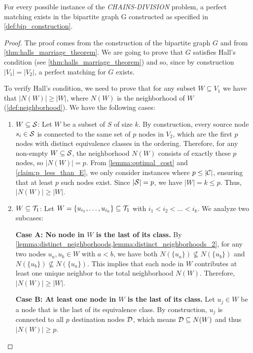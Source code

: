 \begin{lemma} \label{lemma:matching_existence}
    For every possible instance of the \textit{CHAINS-DIVISION} problem, a perfect matching exists in the bipartite graph G constructed as specified in \cref{def:bip_construction}.
\end{lemma}
\begin{proof}
    The proof comes from the construction of the bipartite graph $G$ and from \cref{thm:halls_marriage_theorem}. We are going to prove that $G$ satisfies Hall's condition (see \cref{thm:halls_marriage_theorem}) and so, since by construction $|V_1| = |V_2|$, a perfect matching for $G$ exists.

    To verify Hall's condition, we need to prove that for any subset $W \subseteq V_1$ we have that $|N(W)| \geq |W|$, where $N(W)$ is the neighborhood of $W$ (\cref{def:neighborhood}). We have the following cases:
    \begin{enumerate}[leftmargin=25pt]
        \item $W \subseteq \mathcal{S}$: Let $W$ be a subset of $S$ of size $k$. By construction, every source node $s_i \in \mathcal{S}$ is connected to the same set of $p$ nodes in $V_2$, which are the first $p$ nodes with distinct equivalence classes in the ordering. Therefore, for any non-empty $W \subseteq \mathcal{S}$, the neighborhood $N(W)$ consists of exactly these $p$ nodes, so $|N(W)| = p$. From \cref{lemma:optimal_cost} and \cref{claim:p_less_than_E}, we only consider instances where $p \leq |\mathcal{C}|$, ensuring that at least $p$ such nodes exist. Since $|\mathcal{S}|=p$, we have $|W| = k \leq p$. Thus, $|N(W)| \geq |W|$.
        
        \item $W \subseteq \mathcal{T}_{1}$: Let $W = \{u_{i_1}, \dots, u_{i_k}\} \subseteq \mathcal{T}_{1}$ with $i_1 < i_2 < \dots < i_k$. We analyze two subcases:

        \textbf{Case A: No node in $W$ is the last of its class.}
        By \cref{lemma:distinct_neighborhoods,lemma:distinct_neighborhoods_2}, for any two nodes $u_a, u_b \in W$ with $a < b$, we have both $N(\{u_a\}) \not\subseteq N(\{u_b\})$ and $N(\{u_b\}) \not\subseteq N(\{u_a\})$. This implies that each node in $W$ contributes at least one unique neighbor to the total neighborhood $N(W)$. Therefore, $|N(W)| \geq |W|$.

        \textbf{Case B: At least one node in $W$ is the last of its class.}
        Let $u_{j} \in W$ be a node that is the last of its equivalence class. By construction, $u_{j}$ is connected to all $p$ destination nodes $\mathcal{D}$, which means $\mathcal{D} \subseteq N(W)$ and thus $|N(W)| \geq p$.


\end{enumerate}
\end{proof}
